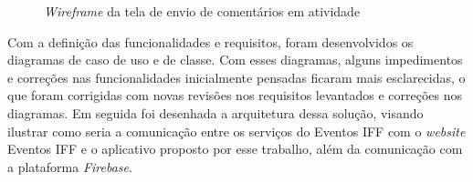 \begin{figure}[H]
    \centering
    \caption{\textit{Wireframe} da tela de envio de comentários em atividade}
    \label{fig:wireframe2}
\end{figure}

Com a definição das funcionalidades e requisitos, foram desenvolvidos os diagramas de caso de uso e de classe. Com esses diagramas, alguns impedimentos e correções nas funcionalidades inicialmente pensadas ficaram mais esclarecidas, o que foram corrigidas com novas revisões nos requisitos levantados e correções nos diagramas. Em seguida foi desenhada a arquitetura dessa solução, visando ilustrar como seria a comunicação entre os serviços do Eventos IFF com o \textit{website} Eventos IFF e o aplicativo proposto por esse trabalho, além da comunicação com a plataforma \textit{Firebase}.

